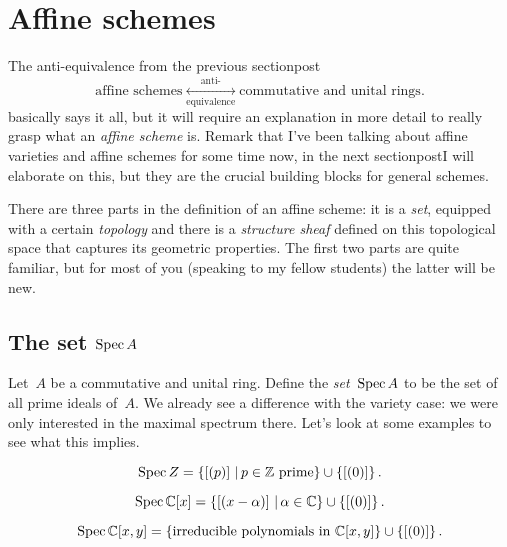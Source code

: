 \section{Affine schemes}
The anti-equivalence from the previous \iftex section\fi\ifblog post\fi
\begin{equation}
  \text{affine schemes} \underset{\text{equivalence}}{\overset{\text{anti-}}{\longleftrightarrow}} \text{commutative and unital rings}.
\end{equation}
basically says it all, but it will require an explanation in more detail to really grasp what an \emph{affine scheme} is. Remark that I've been talking about affine varieties and affine schemes for some time now, in the next \iftex section\fi\ifblog post\fi I will elaborate on this, but they are the crucial building blocks for general schemes.

There are three parts in the definition of an affine scheme: it is a \emph{set}, equipped with a certain \emph{topology} and there is a \emph{structure sheaf} defined on this topological space that captures its geometric properties. The first two parts are quite familiar, but for most of you (speaking to my fellow students) the latter will be new.

\subsection{The set $\operatorname{Spec} A$}
Let~$A$ be a commutative and unital ring. Define the \emph{set~$\operatorname{Spec} A$} to be the set of all prime ideals of~$A$. We already see a difference with the variety case: we were only interested in the maximal spectrum there. Let's look at some examples to see what this implies.

\begin{example}
  \begin{equation}
    \operatorname{Spec} Z=\left\{ \left[ (p) \right]\,|\,\text{$p\in\mathbb{Z}$ prime} \right\}\cup\left\{ [(0)] \right\}.
  \end{equation}
\end{example}

\begin{example}
  \begin{equation}
    \operatorname{Spec}\mathbb{C}[x]=\left\{ \left[ (x-\alpha) \right]\,|\,\alpha\in\mathbb{C} \right\}\cup\left\{ [(0)] \right\}.
  \end{equation}
\end{example}

\begin{example}
  \begin{equation}
    \operatorname{Spec}\mathbb{C}[x,y]=\left\{ \text{irreducible polynomials in~$\mathbb{C}[x,y]$} \right\}\cup\left\{ [(0)] \right\}.
  \end{equation}
\end{example}

